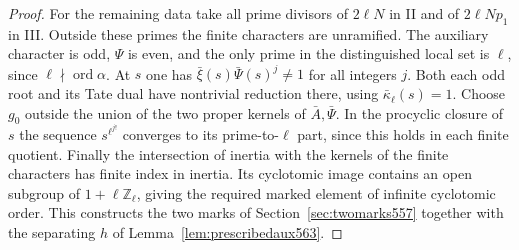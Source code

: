 \documentclass[a4paper,11pt]{article}
\theoremstyle{definition}
\theoremstyle{remark}
\newcommand{\ZZ}{\mathbb Z}\newcommand{\ord}{\operatorname{ord}}
\numberwithin{equation}{section}
\begin{document}
\begin{proof}
For the remaining data take all prime divisors of \(2\ell N\)
in II and of \(2\ell Np_1\) in III. Outside these primes the
finite characters are unramified. The auxiliary character is
odd, \(\Psi\) is even, and the only prime in the distinguished
local set is \(\ell\), since \(\ell\nmid\operatorname{ord}\alpha\).
At \(s\) one has \(\bar\xi(s)\bar\Psi(s)^j\ne1\) for all
integers \(j\). Both each odd root and its Tate dual have
nontrivial reduction there, using \(\bar\kappa_\ell(s)=1\).
Choose \(g_0\) outside the union of the two proper kernels of
\(\bar A,\bar\Psi\). In the procyclic closure of \(s\) the
sequence \(s^{\ell^{j!}}\) converges to its prime-to-\(\ell\)
part, since this holds in each finite quotient. Finally the
intersection of inertia with the kernels of the finite
characters has finite index in inertia. Its cyclotomic image
contains an open subgroup of \(1+\ell\ZZ_\ell\), giving the
required marked element of infinite cyclotomic order. This
constructs the two marks of Section~\ref{sec:twomarks557}
together with the separating \(h\) of Lemma~\ref{lem:prescribedaux563}.
\end{proof}
\end{document}
